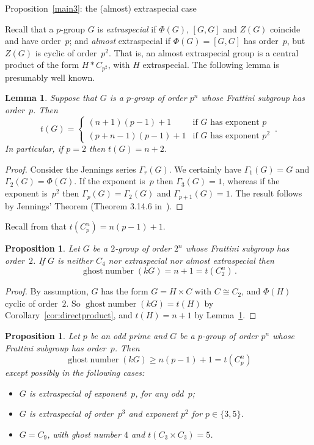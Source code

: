 \documentclass[12pt,reqno]{amsart}
\newtheorem{lem}[thm]{Lemma}
\newtheorem{pro}[thm]{Proposition}
\theoremstyle{definition}
\theoremstyle{remark}
\begin{document}
\begin{section}{Proposition~\ref{main3}: the (almost) extraspecial case}

\noindent
Recall that a $p$-group $G$ is \emph{extraspecial} if $\Phi(G) $, $[G,G]$ and $Z(G)$ coincide and have order~$p$; and \emph{almost} extraspecial if $\Phi(G) = [G,G]$ has order~$p$, but $Z(G)$ is cyclic of order~$p^2$. That is, an almost extraspecial group is a central product of the form $H * C_{p^2}$, with $H$ extraspecial.
The following lemma is presumably well known.

\begin{lem}
\label{lem:extrasp}
Suppose that $G$ is a $p$-group of order $p^n$ whose Frattini subgroup has order~$p$. Then
\[
t(G) = \begin{cases} (n+1)(p-1)+1 & \text{if $G$ has exponent~$p$} \\ (p+n-1)(p-1) + 1 & \text{if $G$ has exponent $p^2$} \end{cases} \, .
\]
In particular, if $p=2$ then $t(G) = n+2$.
\end{lem}

\begin{proof}
Consider the Jennings series $\Gamma_r(G)$. We certainly have $\Gamma_1(G) = G$ and $\Gamma_2(G) = \Phi(G)$.
If the exponent is~$p$ then $\Gamma_3(G) = 1$, whereas if the exponent is~$p^2$ then $\Gamma_p(G) = \Gamma_2(G)$ and $\Gamma_{p+1}(G)=1$. The result follows by Jennings' Theorem (Theorem 3.14.6 in~\cite{Benson:I})\@.
\end{proof}

\noindent
Recall from \cite[Thm 1]{MotoseNinomiya:nilpotencyIndex} that $t(C_p^n) = n(p-1)+1$.

\begin{pro}
\label{evenlbound}
Let $G$ be a $2$-group of order $2^n$ whose Frattini subgroup has order~$2$. If $G$ is neither $C_4$ nor extraspecial nor almost extraspecial then
\[
{\operatorname{ghost\;number}}(kG) = n+1 = t(C_2^n) \, .
\]
\end{pro}

\begin{proof}
By assumption, $G$ has the form $G = H \times C$ with $C \cong C_2$, and $\Phi(H)$ cyclic of order~$2$. So ${\operatorname{ghost\;number}}(kG) = t(H)$ by Corollary~\ref{cor:directproduct}, and $t(H) = n+1$ by Lemma~\ref{lem:extrasp}\@.
\end{proof}

\begin{pro}\label{poddlbound}
Let $p$ be an odd prime and $G$ be a $p$-group of order $p^n$ whose Frattini subgroup has order~$p$. Then
\[
{\operatorname{ghost\;number}}(kG) \geq n(p-1)+1 = t(C_p^n)
\]
except possibly in the following cases:
\begin{itemize}
\item
$G$ is extraspecial of exponent~$p$, for any odd~$p$;
\item
$G$ is extraspecial of order~$p^3$ and exponent $p^2$ for $p \in \{3,5\}$.
\item $G = C_9$, with ghost number $4$ and $t(C_3 \times C_3) = 5$.
\end{itemize}
\end{pro}


\end{section}
\end{document}
